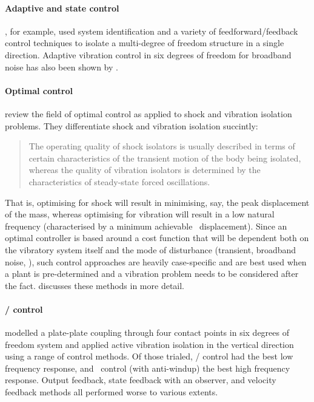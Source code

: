 \paragraph{Adaptive and state control}

\textcite{guo2005}, for example, used system identification and a variety of feedforward/feedback control techniques to isolate a multi-degree of freedom structure in a single direction.
Adaptive vibration control in six degrees of freedom for broadband noise has also been shown by \textcite{duindam2005}.


\paragraph{Optimal control}

\textcite{balandin1998} review the field of optimal control as applied to shock and vibration isolation problems.
They differentiate shock and vibration isolation succintly:
\begin{quote}
The operating quality of shock isolators is usually described in terms of certain characteristics of the transient motion of the body being isolated, whereas the quality of vibration isolators is determined by the characteristics of steady-state forced oscillations.
\end{quote}
That is, optimising for shock will result in minimising, say, the peak displacement of the mass, whereas optimising for vibration will result in a low natural frequency (characterised by a minimum achievable \RMS\ displacement).
Since an optimal controller is based around a cost function that will be dependent both on the vibratory system itself and the mode of disturbance (transient, broadband noise, \etc), such control approaches are heavily case-specific and are best used when a plant is pre-determined and a vibration problem needs to be considered after the fact.
\textcite{bolotnik2001} discusses these methods in more detail.

\paragraph{\Hinf/ control}

\textcite{kerber2007} modelled a plate-plate coupling through four contact points in six degrees of freedom system and applied active vibration isolation in the vertical direction using a range of control methods.
Of those trialed, \Hinf/ control had the best low frequency response, and \PI\ control (with anti-windup) the best high frequency response.
Output feedback, state feedback with an observer, and velocity feedback methods all performed worse to various extents.

